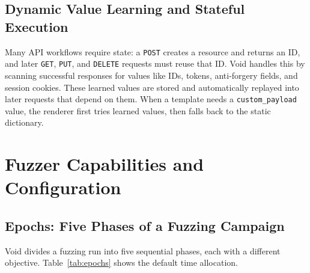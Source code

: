 \documentclass[conference]{IEEEtran}
\begin{document}
\subsection{Dynamic Value Learning and Stateful Execution}
\label{sec:state}

Many API workflows require state: a \texttt{POST} creates a resource and returns an ID, and later \texttt{GET}, \texttt{PUT}, and \texttt{DELETE} requests must reuse that ID. Void handles this by scanning successful responses for values like IDs, tokens, anti-forgery fields, and session cookies. These learned values are stored and automatically replayed into later requests that depend on them. When a template needs a \texttt{custom\_payload} value, the renderer first tries learned values, then falls back to the static dictionary.

\section{Fuzzer Capabilities and Configuration}
\label{sec:capabilities}

\subsection{Epochs: Five Phases of a Fuzzing Campaign}
\label{sec:phases}

Void divides a fuzzing run into five sequential phases, each with a different objective. Table~\ref{tab:epochs} shows the default time allocation.
\end{document}

